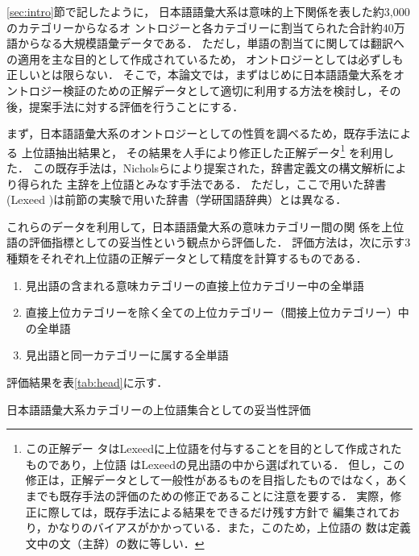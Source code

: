 \documentclass[japanese]{jnlp_1.4}
\begin{document}
\ref{sec:intro}節で記したように，
日本語語彙大系は意味的上下関係を表した約3,000のカテゴリーからなるオ
ントロジーと各カテゴリーに割当てられた合計約40万語からなる大規模語彙データである．
ただし，単語の割当てに関しては翻訳への適用を主な目的として作成されているため，
オントロジーとしては必ずしも正しいとは限らない．
そこで，本論文では，まずはじめに日本語語彙大系をオントロジー検証のための正解データとして適切に利用する方法を検討し，その後，提案手法に対する評価を行うことにする．

まず，日本語語彙大系のオントロジーとしての性質を調べるため，既存手法による
上位語抽出結果と，
その結果を人手により修正した正解データ\footnote{
この正解デー
タはLexeedに上位語を付与することを目的として作成されたものであり，上位語
はLexeedの見出語の中から選ばれている．
{但し，この修正は，正解データとして一般性があるものを目指したものではなく，あくまでも既存手法の評価のための修正であることに注意を要する．
実際，修正に際しては，既存手法による結果をできるだけ残す方針で
編集されており，かなりのバイアスがかかっている．また，このため，上位語の
数は定義文中の文（主辞）の数に等しい．}
}
を利用した．
この既存手法は，Nicholsらにより提案された，辞書定義文の構文解析により得られた
主辞を上位語とみなす手法である\cite{Nichols:Bond:2005}．
ただし，ここで用いた辞書(Lexeed \cite{lexeed})は前節の実験で用いた辞書（学研国語辞典\cite{gakkenj}）とは異なる．

これらのデータを利用して，日本語語彙大系の意味カテゴリー間の関
係を上位語の評価指標としての妥当性という観点から評価した．
評価方法は，次に示す3種類をそれぞれ上位語の正解データとして精度を計算するものである．
\begin{enumerate}
\item 見出語の含まれる意味カテゴリーの直接上位カテゴリー中の全単語
\item 直接上位カテゴリーを除く全ての上位カテゴリー（間接上位カテゴリー）中の全単語
\item 見出語と同一カテゴリーに属する全単語
\end{enumerate}

評価結果を表\ref{tab:head}に示す．

\begin{table}[b]
 \begin{center}
  \caption{日本語語彙大系カテゴリーの上位語集合としての妥当性評価}
  \label{tab:head}

\end{center}
\end{table}
\end{document}
